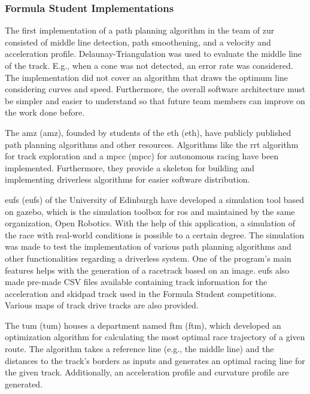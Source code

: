 \subsubsection{Formula Student Implementations} \label{sec:Formula Student Implementations}
The first implementation of a path planning algorithm in the team of \acrshort{zur} consisted of middle line detection, path smoothening, and a velocity and acceleration profile. Delaunay-Triangulation was used to evaluate the middle line of the track. E.g., when a cone was not detected, an error rate was considered. The implementation did not cover an algorithm that draws the optimum line considering curves and speed. Furthermore, the overall software architecture must be simpler and easier to understand so that future team members can improve on the work done before. \cite{autopilot_for_formula_student_jerome}

\pagebreak

The \acrlong{amz} (\acrshort{amz}), founded by students of the \acrlong{eth} (\acrshort{eth}), \cite{amz_racing_about} have publicly published path planning algorithms and other resources. Algorithms like the \acrshort{rrt} algorithm for track exploration and a \acrlong{mpcc} (\acrshort{mpcc}) for autonomous racing have been implemented. Furthermore, they provide a skeleton for building and implementing driverless algorithms for easier software distribution. \cite{amz_racing_github}

\acrlong{eufs} (\acrshort{eufs}) of the University of Edinburgh have developed a simulation tool based on \Gls{gazebo}, which is the simulation toolbox for \acrshort{ros} and maintained by the same organization, Open Robotics. \cite{gazebo_simulator} With the help of this application, a simulation of the race with real-world conditions is possible to a certain degree. The simulation was made to test the implementation of various path planning algorithms and other functionalities regarding a driverless system. One of the program's main features helps with the generation of a racetrack based on an image. \acrshort{eufs} also made pre-made CSV files available containing track information for the acceleration and skidpad track used in the Formula Student competitions. Various maps of track drive tracks are also provided. \cite{eufs_path_planning_and_control} \cite{eufs_sim_gitlab}

The \acrlong{tum} (\acrshort{tum}) houses a department named \acrlong{ftm} (\acrshort{ftm}), which developed an optimization algorithm for calculating the most optimal race trajectory of a given route. The algorithm takes a reference line (e.g., the middle line) and the distances to the track's borders as inputs and generates an optimal racing line for the given track. Additionally, an acceleration profile and curvature profile are generated. \cite{minimum_curvature_trajectory_planning} \cite{minimum_time_trajectory_planning} \cite{tumftm_optimization_algoritm} \cite{tumftm_trajectory_planning_helpers}

